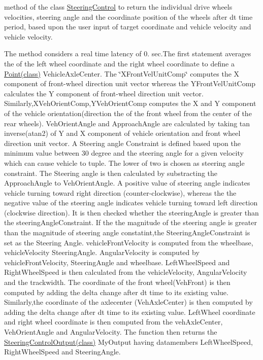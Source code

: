 method of the class \hyperlink{classSteeringControl}{Steering\+Control} to return the individual drive wheels velocities, steering angle and the coordinate position of the wheels after dt time period, based upon the user input of target coordinate and vehicle velocity and vehicle velocity. 

The method considers a real time latency of 0. sec.\+The first statement averages the of the left wheel coordinate and the right wheel coordinate to define a \hyperlink{classPoint}{Point(class)} Vehicle\+Axle\+Center. The \char`\"{}\+X\+Front\+Vel\+Unit\+Comp\char`\"{} computes the X component of front-\/wheel direction unit vector whereas the Y\+Front\+Vel\+Unit\+Comp calculates the Y component of front-\/wheel direction unit vector. Similarly,X\+Veh\+Orient\+Comp,Y\+Veh\+Orient\+Comp computes the X and Y component of the vehicle orientation(direction the of the front wheel from the center of the rear wheels). Veh\+Orient\+Angle and Approach\+Angle are calculated by taking tan inverse(atan2) of Y and X component of vehicle orientation and front wheel direction unit vector. A Steering angle Constraint is defined based upon the minimum value between 30 degree and the steering angle for a given velocity which can cause vehicle to tuple. The lower of two is chosen as steering angle constraint. The Steering angle is then calculated by substracting the Approach\+Angle to Veh\+Orient\+Angle. A positive value of steering angle indicates vehicle turning toward right direction (counter-\/clockwise), whereas the the negative value of the steering angle indicates vehicle turning toward left direction (clockwise direction). It is then checked whether the steering\+Angle is greater than the steering\+Angle\+Constraint. If the the magnitude of the steering angle is greater than the magnitude of steering angle constatint,the Steering\+Angle\+Constraint is set as the Steering Angle. vehicle\+Front\+Velocity is computed from the wheelbase, vehicle\+Velocity Steering\+Angle. Angular\+Velocity is computed by vehicle\+Front\+Velocity, Steering\+Angle and wheelbase. Left\+Wheel\+Speed and Right\+Wheel\+Speed is then calculated from the vehicle\+Velocity, Angular\+Velocity and the trackwidth. The coordinate of the front wheel(\+Veh\+Front) is then computed by adding the delta change after dt time to its existing value. Similarly,the coordinate of the axlecenter (Veh\+Axle\+Center) is then computed by adding the delta change after dt time to its existing value. Left\+Wheel coordinate and right wheel coordinate is then computed from the veh\+Axle\+Center, Veh\+Orient\+Angle and Angular\+Velocity. The function then returns the \hyperlink{classSteeringControlOutput}{Steering\+Control\+Output(class)} My\+Output having datamembers Left\+Wheel\+Speed, Right\+Wheel\+Speed and Steering\+Angle. 
